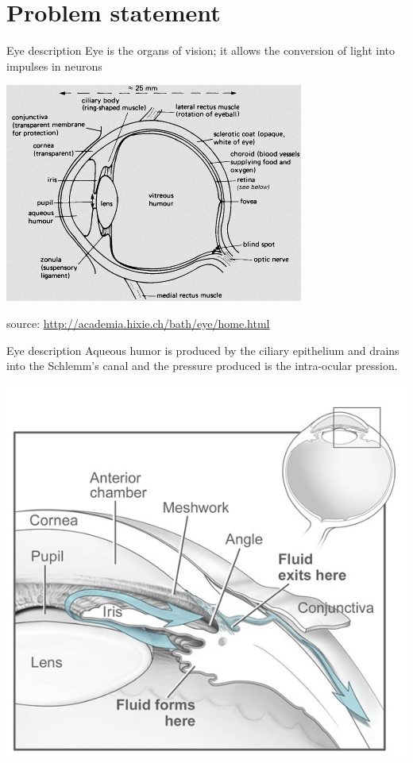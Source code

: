 \documentclass[9pt]{beamer}
\title{}
\begin{document}
\begin{frame}{}
  \maketitle
\end{frame}

\section{Problem statement}

\begin{frame}{Eye description}
Eye is the organs of vision; it allows the conversion of light into impulses in neurons
\begin{center}
\includegraphics[width=.7\linewidth]{Eye.jpg}
\end{center}
\tiny{source: \url{http://academia.hixie.ch/bath/eye/home.html}}
\end{frame}

\begin{frame}{Eye description}
Aqueous humor is produced by the ciliary epithelium and drains into the Schlemm's canal and the pressure produced is the intra-ocular pression.
\begin{center}
\includegraphics[width=.5\linewidth]{Humor.jpg}
\end{center}


\end{frame}
\end{document}
